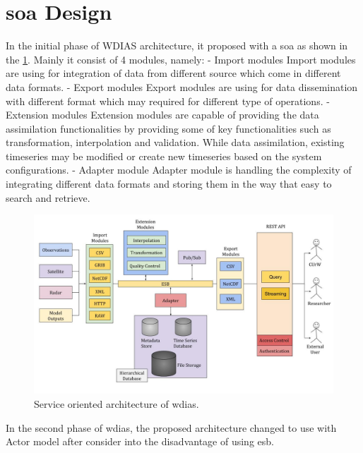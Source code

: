 \section{\acrfull{soa} Design}

In the initial phase of WDIAS architecture, it proposed with a \acrfull{soa} as shown in the \cref{fi:proposed_soa_arch_design}. Mainly it consist of 4 modules, namely:
- Import modules
Import modules are using for integration of data from different source which come in different data formats.
- Export modules
Export modules are using for data dissemination with different format which may required for different type of operations.
- Extension modules
Extension modules are capable of providing the data assimilation functionalities by providing some of key functionalities such as transformation, interpolation and validation. While data assimilation, existing timeseries may be modified or create new timeseries based on the system configurations.
- Adapter module
Adapter module is handling the complexity of integrating different data formats and storing them in the way that easy to search and retrieve.

\begin{figure}[htp]
    \centering
    \includegraphics[width=1\textwidth]{method/soa/soa_v1.jpg}
    \caption{Service oriented architecture of \acrshort{wdias}.}
    \label{fi:proposed_soa_arch_design}
\end{figure}

In the second phase of \acrshort{wdias}, the proposed architecture changed to use with Actor model after consider into the disadvantage of using \acrshort{esb}.
